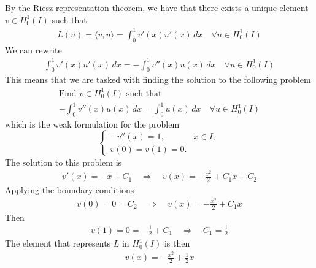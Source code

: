 By the Riesz representation theorem, we have that there exists a unique element
\(v \in H^1_0(I)\) such that
\[
    \begin{split}
        L(u) = \langle v, u \rangle = \int_0^1 v'(x) u'(x) \, dx \quad \forall u \in H^1_0(I)
    \end{split}
\]
We can rewrite
\[
    \begin{split}
        \int_0^1 v'(x) u'(x) \, dx = -\int_0^1 v''(x) u(x) \, dx \quad \forall u \in H^1_0(I)
    \end{split}
\]
This means that we are tasked with finding the solution to the following
problem
\[
    \begin{split}
        \text{Find } v \in H^1_0(I) \text{ such that } \\
        -\int_0^1 v''(x) u(x) \, dx = \int_0^1 u(x) \, dx \quad \forall u \in H^1_0(I)
    \end{split}
\]
which is the weak formulation for the problem
\[
    \begin{cases}
        -v''(x) = 1, & x \in I, \\
        v(0) = v(1) = 0.
    \end{cases}
\]
The solution to this problem is
\[
    \begin{split}
        v'(x) = -x + C_1 \quad \Rightarrow \quad v(x) = -\frac{x^2}{2} + C_1 x + C_2
    \end{split}
\]
Applying the boundary conditions
\[
    \begin{split}
        v(0) = 0 = C_2 \quad \Rightarrow \quad v(x) = -\frac{x^2}{2} + C_1 x
    \end{split}
\]
Then
\[
    \begin{split}
        v(1) = 0 = -\frac{1}{2} + C_1 \quad \Rightarrow \quad C_1 = \frac{1}{2}
    \end{split}
\]
The element that represents \(L\) in \(H^1_0(I)\) is then
\[
    \begin{split}
        v(x) = -\frac{x^2}{2} + \frac{1}{2} x
    \end{split}
\]
